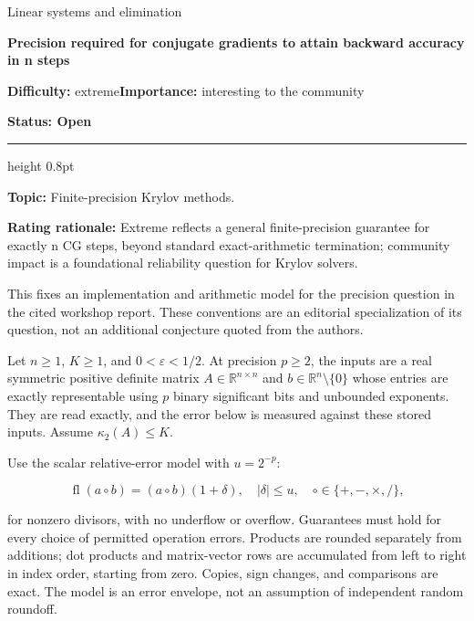 \documentclass[11pt,a4paper]{article}
\begin{document}
{\sffamily\small\color{muted}Linear systems and elimination\par}
\vspace{3pt}
{\raggedright{}\sffamily\bfseries\fontsize{21}{24}\selectfont\color{ink}Precision
required for conjugate gradients to attain backward accuracy in n
steps\par}
\vspace{7pt}
{\sffamily\small\textbf{Difficulty:} extreme\quad\textbf{Importance:} interesting
to the community\par}
{\sffamily\small\bfseries\color{accent}Status: Open\par}
\vspace{4pt}
{\color{accent}\hrule height 0.8pt}
\vspace{6pt}
\textbf{Topic:} Finite-precision Krylov methods.

\textbf{Rating rationale:} Extreme reflects a general finite-precision
guarantee for exactly n CG steps, beyond standard exact-arithmetic
termination; community impact is a foundational reliability question for
Krylov solvers.

This fixes an implementation and arithmetic model for the precision
question in the cited workshop report. These conventions are an
editorial specialization of its question, not an additional conjecture
quoted from the authors.

Let \(n\ge1\), \(K\ge1\), and \(0<\varepsilon<1/2\). At precision
\(p\ge2\), the inputs are a real symmetric positive definite matrix
\(A\in\mathbb R^{n\times n}\) and \(b\in\mathbb R^n\setminus\{0\}\)
whose entries are exactly representable using \(p\) binary significant
bits and unbounded exponents. They are read exactly, and the error below
is measured against these stored inputs. Assume \(\kappa_2(A)\le K\).

Use the scalar relative-error model with \(u=2^{-p}\):

\[
\operatorname{fl}(a\circ b)=(a\circ b)(1+\delta),
\quad |\delta|\le u,\quad \circ\in\{+,-,\times,/\},
\]

for nonzero divisors, with no underflow or overflow. Guarantees must
hold for every choice of permitted operation errors. Products are
rounded separately from additions; dot products and matrix-vector rows
are accumulated from left to right in index order, starting from zero.
Copies, sign changes, and comparisons are exact. The model is an error
envelope, not an assumption of independent random roundoff.
\end{document}
